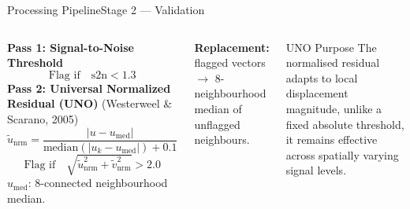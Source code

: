 \documentclass[9pt, aspectratio=169]{beamer}
\begin{document}
\begin{frame}{Processing Pipeline}{Stage 2 --- Validation}
  \begin{columns}[t]
    
    \begin{minipage}[t][\columnheight][t]{\linewidth}
    \vspace{-1.5cm}
      \textbf{Pass 1: Signal-to-Noise Threshold}
      \[
        \text{Flag if} \quad \mathrm{s2n} < 1.3
      \]
      \textbf{Pass 2: Universal Normalized Residual (UNO)}
      \small(Westerweel \& Scarano, 2005)
      \[
        \tilde{u}_{\mathrm{nrm}} =
          \frac{|u - u_{\mathrm{med}}|}
               {\mathrm{median}(|u_k - u_{\mathrm{med}}|) + 0.1}
      \]
      \[
        \text{Flag if} \quad
        \sqrt{\tilde{u}_{\mathrm{nrm}}^2 + \tilde{v}_{\mathrm{nrm}}^2} > 2.0
      \]
      \small $u_{\mathrm{med}}$: 8-connected neighbourhood median.

      \vspace{0.5em}
      \textbf{Replacement:} flagged vectors $\rightarrow$ 8-neighbourhood median of unflagged neighbours.
      \end{minipage}
    \vspace{-0.5cm}
      \begin{block}{UNO Purpose}
        The normalised residual adapts to local displacement magnitude, unlike a fixed absolute threshold, it remains effective across spatially varying signal levels.
      \end{block}
      \vspace{0.3em}
  \end{columns}
\end{frame}
\end{document}
